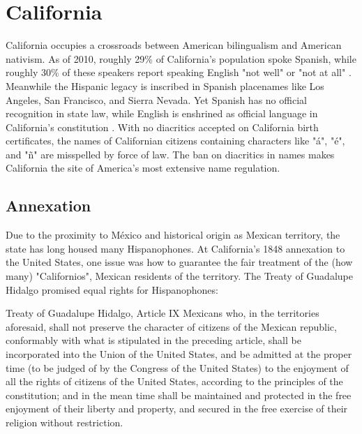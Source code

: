 \section{California}

California occupies a crossroads between American bilingualism and American
nativism. As of 2010, roughly 29\% of California's population spoke Spanish,
while roughly 30\% of these speakers report speaking English "not well" or "not
at all" \parencite{acs-lang-states}. Meanwhile the Hispanic legacy is inscribed
in Spanish placenames like Los Angeles, San Francisco, and Sierra Nevada. Yet
Spanish has no official recognition in state law, while English is enshrined as
official language in California's constitution \parencite{ca-const}. With no
diacritics accepted on California birth certificates, the names of Californian
citizens containing characters like "á", "é", and "ñ" are misspelled by force of
law. The ban on diacritics in names makes California the site of America's most
extensive name regulation.

\subsection{Annexation}

Due to the proximity to México and historical origin as Mexican territory, the
state has long housed many Hispanophones. At California's 1848 annexation to the
United States, one issue was how to guarantee the fair treatment of the (how many)
"Californios", Mexican residents of the territory. The Treaty of Guadalupe
Hidalgo promised equal rights for Hispanophones: 

\begin{aquote}{Treaty of Guadalupe Hidalgo, Article IX}
	Mexicans who, in the territories aforesaid, shall not preserve the character
	of citizens of the Mexican republic, conformably with what is stipulated in
	the preceding article, shall be incorporated into the Union of the United
	States, and be admitted at the proper time (to be judged of by the Congress of
	the United States) to the enjoyment of all the rights of citizens of the
	United States, according to the principles of the constitution; and in the
	mean time shall be maintained and protected in the free enjoyment of their
	liberty and property, and secured in the free exercise of their religion
	without restriction. \parencite{guadalupe}
\end{aquote}

